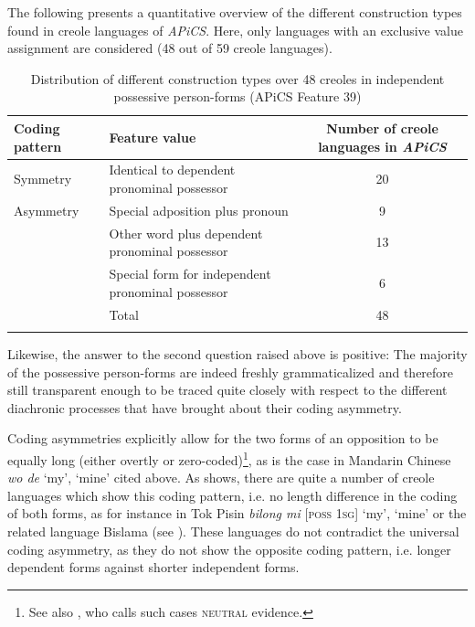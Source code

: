 \documentclass[output=paper]{langsci/langscibook}
\begin{document}
The following  presents a quantitative overview of the different construction types found in creole languages of \textit{APiCS}. Here, only languages with an exclusive value assignment are considered (48 out of 59 creole languages).

\begin{table}
\begin{tabularx}{\textwidth}{l>{\raggedright}p{5.5cm}S}
\lsptoprule

\bfseries Coding pattern & \bfseries Feature value & \bfseries Number of creole languages in \textit{APiCS}\\
\midrule
Symmetry & Identical to dependent pronominal possessor & 20\\

\tablevspace
Asymmetry & Special adposition plus pronoun & 9\\
\tablevspace
 & Other word plus dependent pronominal possessor & 13\\
\tablevspace
 & Special form for independent pronominal possessor & 6\\
\midrule
& Total & 48\\
\lspbottomrule
\end{tabularx}

\caption{Distribution of different construction types over 48 creoles in independent possessive person-forms (APiCS Feature 39)}
\label{tab:michaelis:5}
\end{table}

Likewise, the answer to the second question raised above is positive: The majority of the possessive person-forms are indeed freshly grammaticalized and therefore still transparent enough to be traced quite closely with respect to the different diachronic processes that have brought about their coding asymmetry. 

Coding asymmetries explicitly allow for the two forms of an opposition to be equally long (either overtly or zero-coded)\footnote{See also \citet[58f.]{Croft1991}, who calls such cases \textsc{neutral} evidence.}, as is the case in Mandarin Chinese \textit{wo de} `my', `mine' cited above. As  shows, there are quite a number of creole languages which show this coding pattern, i.e. no length difference in the coding of both forms, as for instance in Tok Pisin \textit{bilong mi} [\textsc{poss} \textsc{1sg}] `my', `mine' or the related language Bislama (see ). These languages do not contradict the universal coding asymmetry, as they do not show the opposite coding pattern, i.e. longer dependent forms against shorter independent forms.
\end{document}
